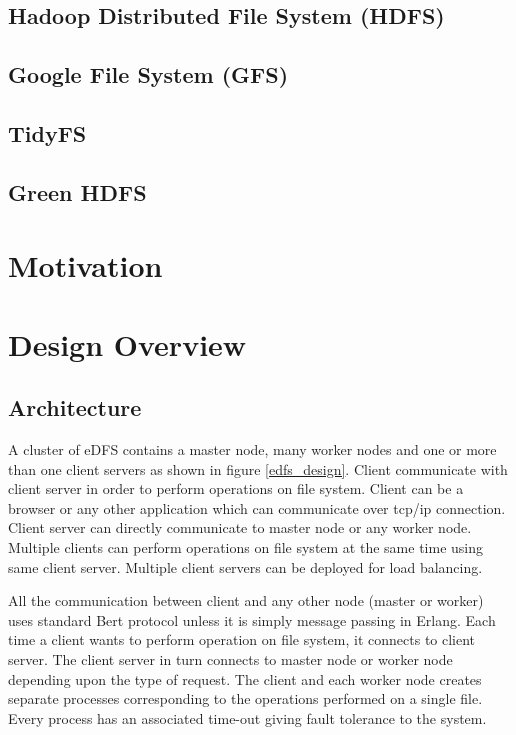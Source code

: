 \documentclass[a4paper,12pt]{article}
\begin{document}
\subsection{Hadoop Distributed File System (HDFS) \cite{hadoop}}

\subsection{Google File System (GFS) \cite{ghemawat03}}

\subsection{TidyFS \cite{tidyfs}}

\subsection{Green HDFS}

\section{Motivation}

\section{Design Overview}
\subsection{Architecture}
A cluster of eDFS contains a master node, many worker nodes and one or more than one client servers as shown in figure \ref{edfs_design}. Client communicate with client server in order to perform operations on file system. Client can be a browser or any other application which can communicate over tcp/ip connection. Client server can directly communicate to master node or any worker node. Multiple clients can perform operations on file system at the same time using same client server. Multiple client servers can be deployed for load balancing.

All the communication between client and any other node (master or worker) uses standard Bert protocol \cite{bert} unless it is simply message passing in Erlang. Each time a client wants to perform operation on file system, it connects to client server. The client server in turn connects to master node or worker node depending upon the type of request. The client and each worker node creates separate processes corresponding to the operations performed on a single file. Every process has an associated time-out giving fault tolerance to the system.
\end{document}
